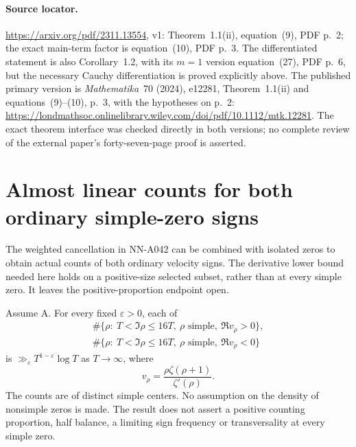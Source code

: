 \paragraph{Source locator.}
\url{https://arxiv.org/pdf/2311.13554}, v1:
Theorem~1.1(ii), equation~(9), PDF p.~2; the exact main-term
factor is equation~(10), PDF p.~3. The differentiated
statement is also Corollary~1.2, with its $m=1$ version
equation~(27), PDF p.~6, but the necessary Cauchy
differentiation is proved explicitly above.
The published primary version is \emph{Mathematika}~70 (2024),
e12281, Theorem~1.1(ii) and equations~(9)--(10), p.~3,
with the hypotheses on p.~2:
\url{https://londmathsoc.onlinelibrary.wiley.com/doi/pdf/10.1112/mtk.12281}.
The exact theorem interface was checked directly in both
versions; no complete review of the external paper's
forty-seven-page proof is asserted.


\section{Almost linear counts for both ordinary simple-zero signs}
\label{sec:A045-simple-signs}

The weighted cancellation in NN-A042 can be combined with
isolated zeros to obtain actual counts of both ordinary
velocity signs. The derivative lower bound needed here holds
on a positive-size selected subset, rather than at every
simple zero. It leaves the positive-proportion endpoint open.

\begin{theorem}
\label{thm:A045-simple-signs}
Assume A. For every fixed \(\varepsilon>0\), each of
\[
 \begin{aligned}
 \#\{\rho:\ T<\Im\rho\le16T,\ \rho\text{ simple},
                                      \ \Re v_\rho>0\},\\
 \#\{\rho:\ T<\Im\rho\le16T,\ \rho\text{ simple},
                                      \ \Re v_\rho<0\}
 \end{aligned}
\]
is \(\gg_\varepsilon T^{1-\varepsilon}\log T\) as
\(T\to\infty\), where
\[
            v_\rho=\frac{\rho\zeta(\rho+1)}{\zeta'(\rho)}.
\]
The counts are of distinct simple centers. No assumption on
the density of nonsimple zeros is made.
The result does not assert a positive counting proportion,
half balance, a limiting sign frequency or transversality
at every simple zero.
\end{theorem}

